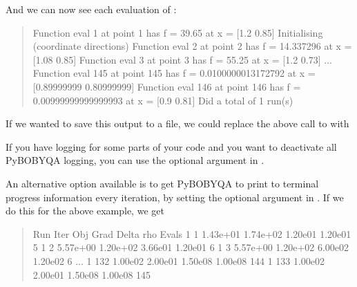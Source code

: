 \documentclass[letterpaper,10pt,english]{sphinxmanual}
\begin{document}
And we can now see each evaluation of :
\begin{quote}

\begin{sphinxVerbatim}[commandchars=\\\{\}]
Function eval 1 at point 1 has f = 39.65 at x = [\PYGZhy{}1.2   0.85]
Initialising (coordinate directions)
Function eval 2 at point 2 has f = 14.337296 at x = [\PYGZhy{}1.08  0.85]
Function eval 3 at point 3 has f = 55.25 at x = [\PYGZhy{}1.2   0.73]
...
Function eval 145 at point 145 has f = 0.0100000013172792 at x = [0.89999999 0.80999999]
Function eval 146 at point 146 has f = 0.00999999999999993 at x = [0.9  0.81]
Did a total of 1 run(s)
\end{sphinxVerbatim}
\end{quote}

If we wanted to save this output to a file, we could replace the above call to  with
\begin{quote}

\begin{sphinxVerbatim}[commandchars=\\\{\}]
 
                     
\end{sphinxVerbatim}
\end{quote}

If you have logging for some parts of your code and you want to deactivate all Py\sphinxhyphen{}BOBYQA logging, you can use the optional argument  in .

An alternative option available is to get Py\sphinxhyphen{}BOBYQA to print to terminal progress information every iteration, by setting the optional argument  in . If we do this for the above example, we get
\begin{quote}

\begin{sphinxVerbatim}[commandchars=\\\{\}]
 Run  Iter     Obj       Grad     Delta      rho     Evals
  1     1    1.43e+01  1.74e+02  1.20e\PYGZhy{}01  1.20e\PYGZhy{}01    5
  1     2    5.57e+00  1.20e+02  3.66e\PYGZhy{}01  1.20e\PYGZhy{}01    6
  1     3    5.57e+00  1.20e+02  6.00e\PYGZhy{}02  1.20e\PYGZhy{}02    6
...
  1    132   1.00e\PYGZhy{}02  2.00e\PYGZhy{}01  1.50e\PYGZhy{}08  1.00e\PYGZhy{}08   144
  1    133   1.00e\PYGZhy{}02  2.00e\PYGZhy{}01  1.50e\PYGZhy{}08  1.00e\PYGZhy{}08   145
\end{sphinxVerbatim}
\end{quote}
\end{document}
